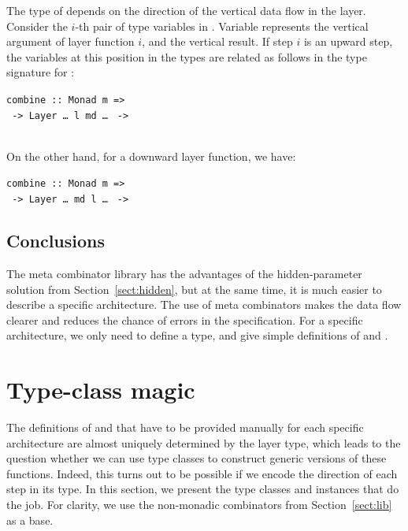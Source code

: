 \documentclass{llncs}
\begin{document}
The type of  depends on the direction of the vertical data flow in the layer. Consider the $i$-th pair of  type variables in . Variable  represents the vertical argument of layer function $i$, and  the vertical result. If step $i$ is an upward step, the variables at this position in the  types are related as follows in the type signature for :

\begin{small}
\begin{tabbing}
{\tt  combine :: }\={\tt Monad m =>}\\
                  \verb| -> |{\tt Layer \dots~l~md \dots} \verb| ->|\\
                  \\
\end{tabbing}
\end{small}

On the other hand, for a downward layer function, we have:

\begin{small}
\begin{tabbing}
{\tt  combine :: }\={\tt Monad m =>}\\
                  \verb| -> |{\tt Layer \dots~md l \dots} \verb| ->|\\
\end{tabbing}
\end{small}


\subsection{Conclusions} 

The meta combinator library has the advantages of the hidden-parameter solution from Section~\ref{sect:hidden}, but at the same time, it is much easier to describe a specific architecture. The use of meta combinators makes the data flow clearer and reduces the chance of errors in the specification. For a specific architecture, we only need to define a  type, and give simple definitions of  and .
\section{Type-class magic} \label{sect:typeClass}

The definitions of  and  that have to be provided manually for each specific architecture are almost uniquely determined by the layer type, which leads to the question whether we can use type classes to construct generic versions of these functions. Indeed, this turns out to be possible if we encode the direction of each step in its type. In this section, we present the type classes and instances that do the job. For clarity, we use the non-monadic combinators from Section~\ref{sect:lib} as a base.
\end{document}

